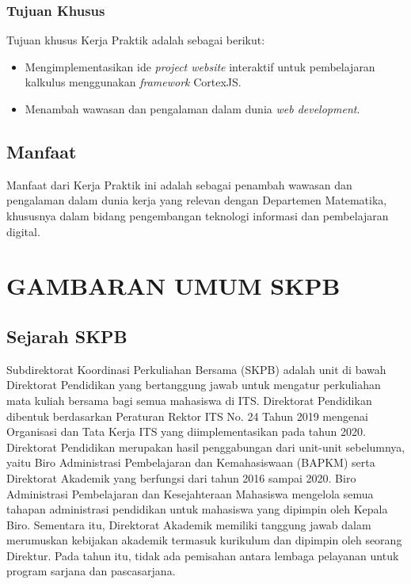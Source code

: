 \documentclass{file/KP-ITS}
\theoremstyle{definition}
\theoremstyle{definition}
\theoremstyle{plain}
\begin{document}
\subsection{Tujuan Khusus}
Tujuan khusus Kerja Praktik adalah sebagai berikut:
\begin{itemize}
  \item Mengimplementasikan ide \textit{project website} interaktif untuk pembelajaran kalkulus menggunakan \textit{framework} CortexJS.
  \item Menambah wawasan dan pengalaman dalam dunia \textit{web development}.
\end{itemize}

\section{Manfaat}
Manfaat dari Kerja Praktik ini adalah sebagai penambah wawasan dan pengalaman dalam dunia kerja yang relevan dengan Departemen Matematika, khususnya dalam bidang pengembangan teknologi informasi dan pembelajaran digital.


\pagebreak
\chapter{GAMBARAN UMUM SKPB}

\section{Sejarah SKPB}
Subdirektorat Koordinasi Perkuliahan Bersama (SKPB) adalah unit di bawah Direktorat Pendidikan yang bertanggung jawab untuk mengatur perkuliahan mata kuliah bersama bagi semua mahasiswa di ITS. Direktorat Pendidikan dibentuk berdasarkan Peraturan Rektor ITS No. 24 Tahun 2019 mengenai Organisasi dan Tata Kerja ITS yang diimplementasikan pada tahun 2020. Direktorat Pendidikan merupakan hasil penggabungan dari unit-unit sebelumnya, yaitu Biro Administrasi Pembelajaran dan Kemahasiswaan (BAPKM) serta Direktorat Akademik yang berfungsi dari tahun 2016 sampai 2020. Biro Administrasi Pembelajaran dan Kesejahteraan Mahasiswa mengelola semua tahapan administrasi pendidikan untuk mahasiswa yang dipimpin oleh Kepala Biro. Sementara itu, Direktorat Akademik memiliki tanggung jawab dalam merumuskan kebijakan akademik termasuk kurikulum dan dipimpin oleh seorang Direktur. Pada tahun itu, tidak ada pemisahan antara lembaga pelayanan untuk program sarjana dan pascasarjana.
\end{document}
